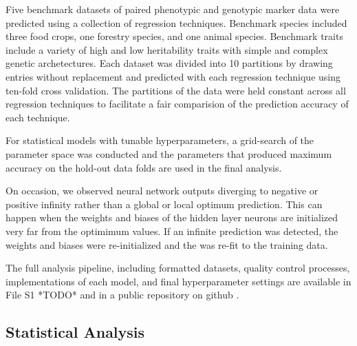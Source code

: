 Five benchmark datasets of paired phenotypic and genotypic marker data were predicted 
using a collection of regression techniques. Benchmark species included three food crops, 
one forestry species, and one animal species. Benchmark traits include a variety of high and low
heritability traits with simple and complex genetic archetectures. Each dataset was divided
into 10 partitions by drawing entries without replacement and predicted with each
regression technique using ten-fold cross validation. The partitions of the data were 
held constant across all regression techniques to facilitate a fair comparision of the
prediction accuracy of each technique.

For statistical models with tunable hyperparameters, a grid-search of the parameter 
space was conducted and the parameters that produced maximum accuracy on the hold-out
data folds are used in the final analysis. 

On occasion, we observed neural network outputs diverging to negative or positive infinity rather
than a global or local optimum prediction. This can happen when the weights and biases of the 
hidden layer neurons are initialized very far from the optimimum values. If an infinite prediction 
was detected, the weights and biases were re-initialized and the was re-fit to the training data.

The full analysis pipeline, including formatted datasets, quality control processes, 
implementations of each model, and final hyperparameter settings are available in File S1 *TODO* and
in a public repository on github \citep{mcdowell2016}.


\subsection*{Statistical Analysis} 

